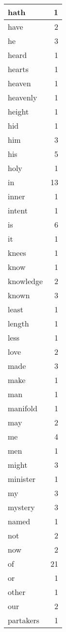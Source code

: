 \begin{center}
\begin{longtable}{l|r}
hath & 1\\ \hline 
have & 2\\ \hline 
he & 3\\ \hline 
heard & 1\\ \hline 
hearts & 1\\ \hline 
heaven & 1\\ \hline 
heavenly & 1\\ \hline 
height & 1\\ \hline 
hid & 1\\ \hline 
him & 3\\ \hline 
his & 5\\ \hline 
holy & 1\\ \hline 
in & 13\\ \hline 
inner & 1\\ \hline 
intent & 1\\ \hline 
is & 6\\ \hline 
it & 1\\ \hline 
knees & 1\\ \hline 
know & 1\\ \hline 
knowledge & 2\\ \hline 
known & 3\\ \hline 
least & 1\\ \hline 
length & 1\\ \hline 
less & 1\\ \hline 
love & 2\\ \hline 
made & 3\\ \hline 
make & 1\\ \hline 
man & 1\\ \hline 
manifold & 1\\ \hline 
may & 2\\ \hline 
me & 4\\ \hline 
men & 1\\ \hline 
might & 3\\ \hline 
minister & 1\\ \hline 
my & 3\\ \hline 
mystery & 3\\ \hline 
named & 1\\ \hline 
not & 2\\ \hline 
now & 2\\ \hline 
of & 21\\ \hline 
or & 1\\ \hline 
other & 1\\ \hline 
our & 2\\ \hline 
partakers & 1\\ \hline 

\end{longtable}
\end{center}
